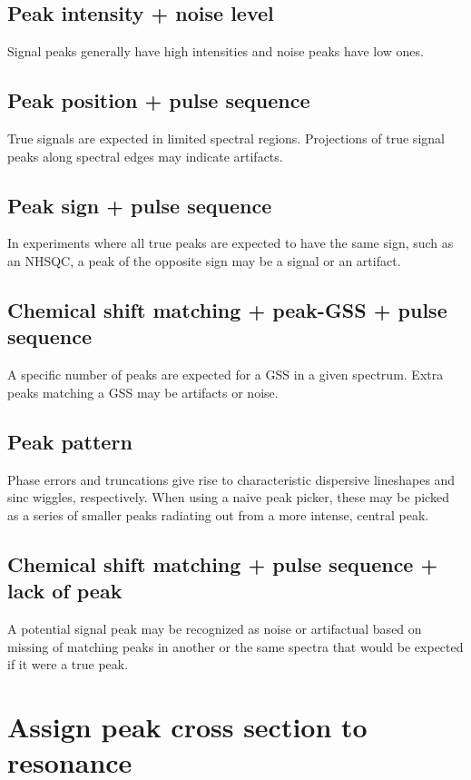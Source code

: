 \subsection*{Peak intensity + noise level}
Signal peaks generally have high intensities and noise peaks have low ones.

\subsection*{Peak position + pulse sequence}
True signals are expected in limited spectral regions.
Projections of true signal peaks along spectral edges may indicate artifacts.

\subsection*{Peak sign + pulse sequence}
In experiments where all true peaks are expected to have the same sign, such 
as an NHSQC, a peak of the opposite sign may be a signal or an artifact.

\subsection*{Chemical shift matching + peak-GSS + pulse sequence}
A specific number of peaks are expected for a GSS in a given spectrum.
Extra peaks matching a GSS may be artifacts or noise.

\subsection*{Peak pattern}
Phase errors and truncations give rise to characteristic dispersive lineshapes
and sinc wiggles, respectively.  When using a naive peak picker, these may
be picked as a series of smaller peaks radiating out from a more intense,
central peak.

\subsection*{Chemical shift matching + pulse sequence + lack of peak}
A potential signal peak may be recognized as noise or artifactual based on
missing of matching peaks in another or the same spectra that would be 
expected if it were a true peak.



\section*{Assign peak cross section to resonance}

